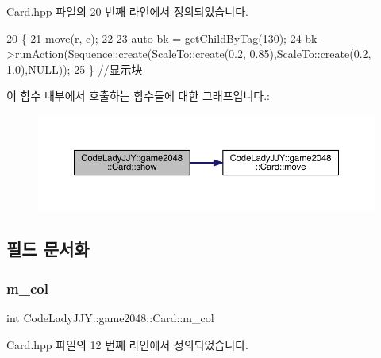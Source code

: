 Card.\+hpp 파일의 20 번째 라인에서 정의되었습니다.


\begin{DoxyCode}
20                            \{
21         \hyperlink{class_code_lady_j_j_y_1_1game2048_1_1_card_a6ad341b10626a9cc1aafe8229fa61ea6}{move}(r, c);
22 
23     \textcolor{keyword}{auto} bk = getChildByTag(130);
24     bk->runAction(Sequence::create(ScaleTo::create(0.2, 0.85),ScaleTo::create(0.2, 1.0),NULL));
25     \}   \textcolor{comment}{//显示块}
\end{DoxyCode}
이 함수 내부에서 호출하는 함수들에 대한 그래프입니다.\+:
\nopagebreak
\begin{figure}[H]
\begin{center}
\leavevmode
\includegraphics[width=350pt]{d6/d12/class_code_lady_j_j_y_1_1game2048_1_1_card_abd3f3208867d1450ba4eeef3cef62d3f_cgraph}
\end{center}
\end{figure}


\subsection{필드 문서화}
\mbox{\label{class_code_lady_j_j_y_1_1game2048_1_1_card_a236bc4d61f156c7c72fd7ed0cf6cb7c7}} 
\subsubsection{\texorpdfstring{m\+\_\+col}{m\_col}}
{\footnotesize\ttfamily int Code\+Lady\+J\+J\+Y\+::game2048\+::\+Card\+::m\+\_\+col\hspace{0.3cm}{\ttfamily [private]}}



Card.\+hpp 파일의 12 번째 라인에서 정의되었습니다.

\mbox{\label{class_code_lady_j_j_y_1_1game2048_1_1_card_ae612aaa37e50cb81d6f8ddb7283ebcbc}} 
